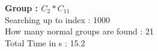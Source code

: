 \textbf{Group : $C_2*C_{11}$}\\
Searching up to index : 1000\\
How many normal groups are found : 21\\
Total Time in s : 15.2\\
